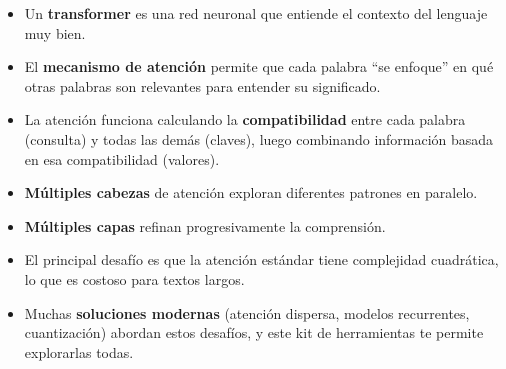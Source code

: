 \documentclass[11pt,a4paper]{article}
\begin{document}
\begin{itemize}[leftmargin=*]
    \item Un \textbf{transformer} es una red neuronal que entiende el contexto del lenguaje muy bien.
    \item El \textbf{mecanismo de atención} permite que cada palabra ``se enfoque'' en qué otras palabras son relevantes para entender su significado.
    \item La atención funciona calculando la \textbf{compatibilidad} entre cada palabra (consulta) y todas las demás (claves), luego combinando información basada en esa compatibilidad (valores).
    \item \textbf{Múltiples cabezas} de atención exploran diferentes patrones en paralelo.
    \item \textbf{Múltiples capas} refinan progresivamente la comprensión.
    \item El principal desafío es que la atención estándar tiene complejidad cuadrática, lo que es costoso para textos largos.
    \item Muchas \textbf{soluciones modernas} (atención dispersa, modelos recurrentes, cuantización) abordan estos desafíos, y este kit de herramientas te permite explorarlas todas.
\end{itemize}
\end{document}

